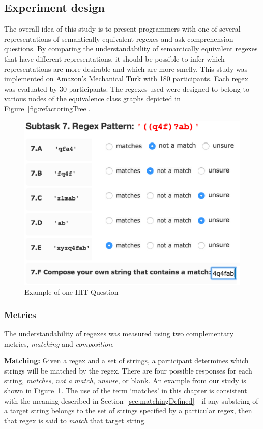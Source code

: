 
\subsection{Experiment design}

The overall idea of this study is to present programmers with one of several representations of semantically equivalent regexes and ask comprehension questions. By comparing the understandability of semantically equivalent regexes that have different representations, it should be possible to infer which representations are more desirable and which are more smelly.
This study was implemented on Amazon's Mechanical Turk with 180 participants.  Each regex was evaluated by 30 participants.
The regexes used were designed to belong to various nodes of the equivalence class graphs depicted in Figure~\ref{fig:refactoringTree}.

\begin{figure}[tb]
\centering
\includegraphics[width=0.54\columnwidth]{nontex/illustrations/exampleQuestion.eps}
\vspace{-12pt}
\caption{Example of one HIT Question}
\vspace{-6pt}
\label{fig:exampleQuestion}
\end{figure}



\subsubsection{Metrics}
The understandability of regexes was measured using two complementary metrics, \emph{matching} and \emph{composition}.

\textbf{Matching:}
Given a regex and a set of strings, a participant determines which strings will be matched by the regex. There are four possible responses for each string, \emph{matches}, \emph{not a match}, \emph{unsure}, or blank. An example from our study is shown in Figure~\ref{fig:exampleQuestion}.  The use of the term `matches' in this chapter is consistent with the meaning described in Section~\ref{sec:matchingDefined} - if any substring of a target string belongs to the set of strings specified by a particular regex, then that regex is said to \emph{match} that target string.


